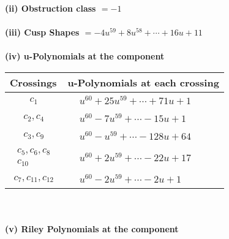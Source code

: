 \documentclass[1p]{elsarticle_modified}
\theoremstyle{definition}
\begin{document}
\flushleft \textbf{(ii) Obstruction class $= -1$}\\~\\
\flushleft \textbf{(iii) Cusp Shapes $= -4 u^{59}+8 u^{58}+\cdots+16 u+11$}\\~\\
\newpage\renewcommand{\arraystretch}{1}
\flushleft \textbf{(iv) u-Polynomials at the component}\newline \\
\begin{tabular}{m{50pt}|m{274pt}}
Crossings & \hspace{64pt}u-Polynomials at each crossing \\
\hline $$\begin{aligned}c_{1}\end{aligned}$$&$\begin{aligned}
&u^{60}+25 u^{59}+\cdots+71 u+1
\end{aligned}$\\
\hline $$\begin{aligned}c_{2},c_{4}\end{aligned}$$&$\begin{aligned}
&u^{60}-7 u^{59}+\cdots-15 u+1
\end{aligned}$\\
\hline $$\begin{aligned}c_{3},c_{9}\end{aligned}$$&$\begin{aligned}
&u^{60}- u^{59}+\cdots-128 u+64
\end{aligned}$\\
\hline $$\begin{aligned}c_{5},c_{6},c_{8}\\c_{10}\end{aligned}$$&$\begin{aligned}
&u^{60}+2 u^{59}+\cdots-22 u+17
\end{aligned}$\\
\hline $$\begin{aligned}c_{7},c_{11},c_{12}\end{aligned}$$&$\begin{aligned}
&u^{60}-2 u^{59}+\cdots-2 u+1
\end{aligned}$\\
\hline
\end{tabular}\\~\\
\newpage\renewcommand{\arraystretch}{1}
\flushleft \textbf{(v) Riley Polynomials at the component}\newline \\
\end{document}
